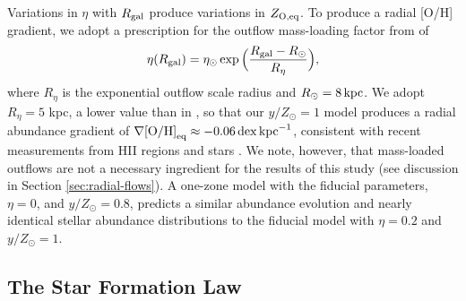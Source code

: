 \documentclass[twocolumn,twocolappendix]{aastex701}
\newcommand{\mathOH}{{\rm [O/H]}}
\newcommand{\yZ}[1]{$y/Z_\odot=#1$}
\newcommand{\kpc}{\,{\rm kpc}}
\begin{document}
Variations in $\eta$ with $R_{\rm gal}$ produce variations in $Z_{\rm O,eq}$. To produce a radial [O/H] gradient, we adopt a prescription for the outflow mass-loading factor from \citet{johnson_milky_2025} of
\begin{equation}
    \eta(R_{\rm gal}) = \eta_\odot \exp\Big(\frac{R_{\rm gal}-R_\odot}{R_\eta}\Big),
\end{equation}
where $R_\eta$ is the exponential outflow scale radius and $R_\odot=8\kpc$. We adopt $R_\eta=5$ kpc, a lower value than in \citet{johnson_milky_2025}, so that our $y/Z_\odot=1$ model produces a radial abundance gradient of $\nabla\mathOH_{\rm eq}\approx-0.06\,{\rm dex}\kpc^{-1}$, consistent with recent measurements from HII regions \citep{mendez-delgado_gradients_2022} and stars \citep{myers_open_2022,johnson_milky_2025}. We note, however, that mass-loaded outflows are not a necessary ingredient for the results of this study (see discussion in Section \ref{sec:radial-flows}). A one-zone model with the fiducial parameters, $\eta=0$, and \yZ{0.8}, predicts a similar abundance evolution and nearly identical stellar abundance distributions to the fiducial model with $\eta=0.2$ and \yZ{1}.

\subsection{The Star Formation Law}
\label{sec:sf-law}
\end{document}
